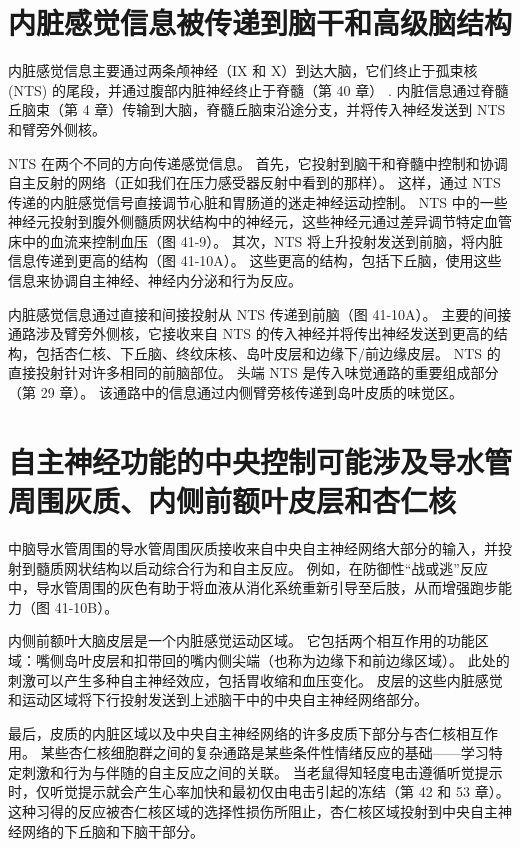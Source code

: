 \section{内脏感觉信息被传递到脑干和高级脑结构}
内脏感觉信息主要通过两条颅神经（IX 和 X）到达大脑，它们终止于孤束核 (NTS) 的尾段，并通过腹部内脏神经终止于脊髓（第 40 章） . 内脏信息通过脊髓丘脑束（第 4 章）传输到大脑，脊髓丘脑束沿途分支，并将传入神经发送到 NTS 和臂旁外侧核。

NTS 在两个不同的方向传递感觉信息。 首先，它投射到脑干和脊髓中控制和协调自主反射的网络（正如我们在压力感受器反射中看到的那样）。 这样，通过 NTS 传递的内脏感觉信号直接调节心脏和胃肠道的迷走神经运动控制。 NTS 中的一些神经元投射到腹外侧髓质网状结构中的神经元，这些神经元通过差异调节特定血管床中的血流来控制血压（图 41-9）。 其次，NTS 将上升投射发送到前脑，将内脏信息传递到更高的结构（图 41-10A）。 这些更高的结构，包括下丘脑，使用这些信息来协调自主神经、神经内分泌和行为反应。

内脏感觉信息通过直接和间接投射从 NTS 传递到前脑（图 41-10A）。 主要的间接通路涉及臂旁外侧核，它接收来自 NTS 的传入神经并将传出神经发送到更高的结构，包括杏仁核、下丘脑、终纹床核、岛叶皮层和边缘下/前边缘皮层。 NTS 的直接投射针对许多相同的前脑部位。 头端 NTS 是传入味觉通路的重要组成部分（第 29 章）。 该通路中的信息通过内侧臂旁核传递到岛叶皮质的味觉区。

\section{自主神经功能的中央控制可能涉及导水管周围灰质、内侧前额叶皮层和杏仁核}
中脑导水管周围的导水管周围灰质接收来自中央自主神经网络大部分的输入，并投射到髓质网状结构以启动综合行为和自主反应。 例如，在防御性“战或逃”反应中，导水管周围的灰色有助于将血液从消化系统重新引导至后肢，从而增强跑步能力（图 41-10B）。

内侧前额叶大脑皮层是一个内脏感觉运动区域。 它包括两个相互作用的功能区域：嘴侧岛叶皮层和扣带回的嘴内侧尖端（也称为边缘下和前边缘区域）。 此处的刺激可以产生多种自主神经效应，包括胃收缩和血压变化。 皮层的这些内脏感觉和运动区域将下行投射发送到上述脑干中的中央自主神经网络部分。

最后，皮质的内脏区域以及中央自主神经网络的许多皮质下部分与杏仁核相互作用。 某些杏仁核细胞群之间的复杂通路是某些条件性情绪反应的基础——学习特定刺激和行为与伴随的自主反应之间的关联。 当老鼠得知轻度电击遵循听觉提示时，仅听觉提示就会产生心率加快和最初仅由电击引起的冻结（第 42 和 53 章）。 这种习得的反应被杏仁核区域的选择性损伤所阻止，杏仁核区域投射到中央自主神经网络的下丘脑和下脑干部分。


